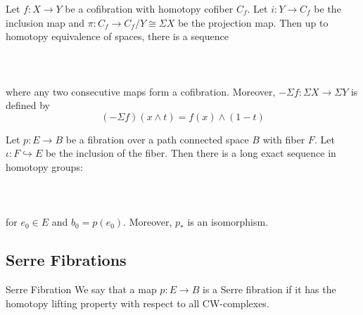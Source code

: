 \documentclass[a4paper]{article}
\begin{document}
\begin{thm}{}{} Let $f:X\to Y$ be a cofibration with homotopy cofiber $C_f$. Let $i:Y\to C_f$ be the inclusion map and $\pi:C_f\to C_f/Y\cong\Sigma X$ be the projection map. Then up to homotopy equivalence of spaces, there is a sequence \\~\\
\\~\\
where any two consecutive maps form a cofibration. Moreover, $-\Sigma f:\Sigma X\to\Sigma Y$ is defined by $$(-\Sigma f)(x\wedge t)=f(x)\wedge(1-t)$$
\end{thm}

\begin{thm}{}{} Let $p:E\to B$ be a fibration over a path connected space $B$ with fiber $F$. Let $\iota:F\hookrightarrow E$ be the inclusion of the fiber. Then there is a long exact sequence in homotopy groups: \\~\\
\\~\\
for $e_0\in E$ and $b_0=p(e_0)$. Moreover, $p_\ast$ is an isomorphism. 
\end{thm}

\subsection{Serre Fibrations}
\begin{defn}{Serre Fibration}{} We say that a map $p:E\to B$ is a Serre fibration if it has the homotopy lifting property with respect to all CW-complexes. 
\end{defn}
\end{document}
